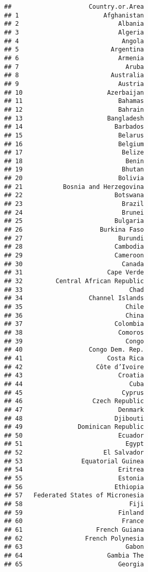 \documentclass[]{article}
\begin{document}
\begin{verbatim}
##                     Country.or.Area
## 1                       Afghanistan
## 2                           Albania
## 3                           Algeria
## 4                            Angola
## 5                         Argentina
## 6                           Armenia
## 7                             Aruba
## 8                         Australia
## 9                           Austria
## 10                       Azerbaijan
## 11                          Bahamas
## 12                          Bahrain
## 13                       Bangladesh
## 14                         Barbados
## 15                          Belarus
## 16                          Belgium
## 17                           Belize
## 18                            Benin
## 19                           Bhutan
## 20                          Bolivia
## 21           Bosnia and Herzegovina
## 22                         Botswana
## 23                           Brazil
## 24                           Brunei
## 25                         Bulgaria
## 26                     Burkina Faso
## 27                          Burundi
## 28                         Cambodia
## 29                         Cameroon
## 30                           Canada
## 31                       Cape Verde
## 32         Central African Republic
## 33                             Chad
## 34                  Channel Islands
## 35                            Chile
## 36                            China
## 37                         Colombia
## 38                          Comoros
## 39                            Congo
## 40                  Congo Dem. Rep.
## 41                       Costa Rica
## 42                    Côte d’Ivoire
## 43                          Croatia
## 44                             Cuba
## 45                           Cyprus
## 46                   Czech Republic
## 47                          Denmark
## 48                         Djibouti
## 49               Dominican Republic
## 50                          Ecuador
## 51                            Egypt
## 52                      El Salvador
## 53                Equatorial Guinea
## 54                          Eritrea
## 55                          Estonia
## 56                         Ethiopia
## 57   Federated States of Micronesia
## 58                             Fiji
## 59                          Finland
## 60                           France
## 61                    French Guiana
## 62                 French Polynesia
## 63                            Gabon
## 64                       Gambia The
## 65                          Georgia

\end{verbatim}
\end{document}

